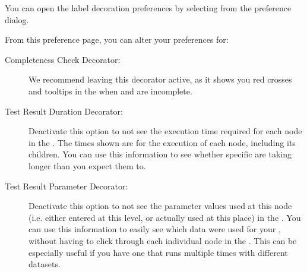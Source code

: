 You can open the label decoration preferences by  selecting  from the preference dialog. 

From this preference page, you can alter your preferences for:
\begin{description}
\item[Completeness Check Decorator:]{ We recommend leaving this decorator active, as it shows you red crosses and tooltips in the \gdtestsuitebrowser{} when \gdsuites{} and \gdjobs{} are incomplete.}
\item[Test Result Duration Decorator:]{Deactivate this option to not see the execution time required for each node in the \gdtestresultview{}. The times shown are for the execution of each node, including its children. You can use this information to see whether specific \gdcases{} are taking longer than you expect them to.}
\item[Test Result Parameter Decorator:]{Deactivate this option to not see the parameter values used at this node (i.e. either entered at this level, or actually used at this place) in the \gdtestresultview{}. You can use this information to easily see which data were used for your \gdcases{}, without having to click through each individual node in the \gdtestresultview{}. This can be especially useful if you have one \gdcase{} that runs multiple times with different datasets. }
\end{description}

